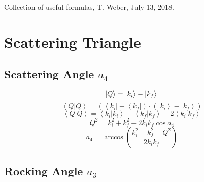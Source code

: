 \documentclass{article}
\begin{document}
Collection of useful formulas, T. Weber, July 13, 2018.


\section{Scattering Triangle}


\subsection*{Scattering Angle $a_4$}

\begin{equation}
\left| Q \right> = \left| k_i \right> - \left| k_f \right> \\
\end{equation}
\begin{equation}
\left< Q | Q \right> = \left( \left< k_i \right| - \left< k_f \right| \right) \cdot \left( \left| k_i \right> - \left| k_f \right> \right)
\end{equation}
\begin{equation}
\left< Q | Q \right> = \left< k_i | k_i \right> + \left< k_f | k_f \right> - 2 \left< k_i | k_f \right>
\end{equation}
\begin{equation}
Q^2 = k_i^2 + k_f^2 - 2 k_i k_f \cos a_4
\end{equation}
\begin{equation}
a_4 = \arccos \left( \frac{k_i^2 + k_f^2 - Q^2}{2 k_i k_f} \right)
\end{equation}



\subsection*{Rocking Angle $a_3$}
\end{document}
